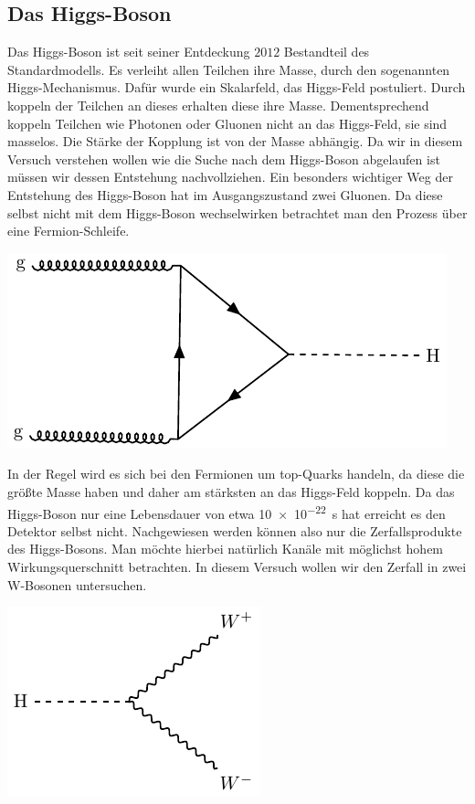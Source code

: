 \subsection{Das Higgs-Boson}
Das Higgs-Boson ist seit seiner Entdeckung $2012$ Bestandteil des Standardmodells.
Es verleiht allen Teilchen ihre Masse, durch den sogenannten Higgs-Mechanismus.
Dafür wurde ein Skalarfeld, das Higgs-Feld postuliert.
Durch koppeln der Teilchen an dieses erhalten diese ihre Masse.
Dementsprechend koppeln Teilchen wie Photonen oder Gluonen nicht an das Higgs-Feld, sie sind masselos.
Die Stärke der Kopplung ist von der Masse abhängig.
Da wir in diesem Versuch verstehen wollen wie die Suche nach dem Higgs-Boson abgelaufen ist müssen wir dessen Entstehung nachvollziehen.
Ein besonders wichtiger Weg der Entstehung des Higgs-Boson hat im Ausgangszustand zwei Gluonen.
Da diese selbst nicht mit dem Higgs-Boson wechselwirken betrachtet man den Prozess über eine Fermion-Schleife.
\begin{center}
\includegraphics{../Pictures/generate_feynman_higgs/higgs-feynman.pdf}
\label{Higgs-aus-gg}
\end{center}
In der Regel wird es sich bei den Fermionen um top-Quarks handeln, da diese die größte Masse haben und daher am stärksten an das Higgs-Feld koppeln.
Da das Higgs-Boson nur eine Lebensdauer von etwa \SI{10e-22}{\second} hat erreicht es den Detektor selbst nicht.
Nachgewiesen werden können also nur die Zerfallsprodukte des Higgs-Bosons.
Man möchte hierbei natürlich Kanäle mit möglichst hohem Wirkungsquerschnitt betrachten.
In diesem Versuch wollen wir den Zerfall in zwei W-Bosonen untersuchen.
\begin{center}
\includegraphics{../Pictures/generate_feynman_HWW/HWW-feynman.pdf}
\label{HWW}
\end{center}
